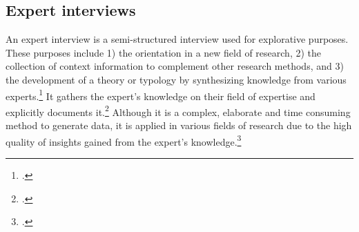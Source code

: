
\subsection{Expert interviews} \label{subsec:ExpertInterviews}
An expert interview is a semi-structured interview used for explorative purposes. These purposes include 1) the orientation in a new field of research, 2) the collection of context information to complement other research methods, and 3) the development of a theory or typology by synthesizing knowledge from various experts.\footcite[Cf.][p.450]{PfadenhauerExperteninterviewGesprachauf2007} It gathers the expert's knowledge on their field of expertise and explicitly documents it.\footcites[cf.][p.172]{HickeyElicitationtechniqueselection2003} Although it is a complex, elaborate and time consuming method to generate data, it is applied in various fields of research due to the high quality of insights gained from the expert's knowledge.\footcites[Cf.][p.459]{PfadenhauerExperteninterviewGesprachauf2007}[cf.][p.442]{MeuserExpertInneninterviewsvielfacherprobt1991}[cf.][p.424]{BuberQualitativeMarktforschungKonzepte2007}[cf.][p.179]{Flickintroductionqualitativeresearch2009}[cf.][p.465]{MeuserExperteninterviewkonzeptionelleGrundlagen2009}[cf.][p.31]{BognerInterviewsmitExperten2014}

